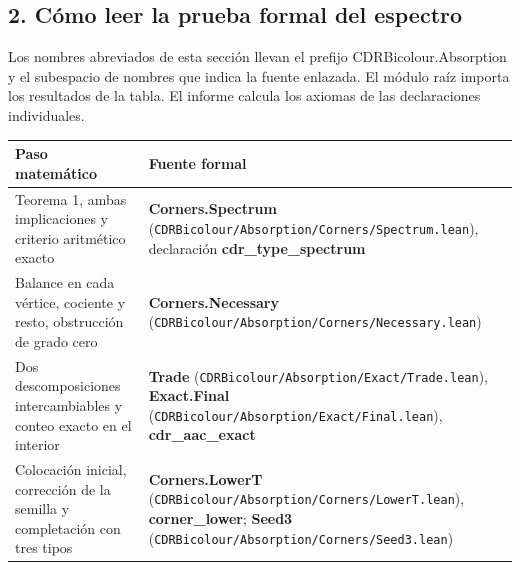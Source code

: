 \documentclass[spanish,11pt,a4paper]{article}
\begin{document}
\subsection{2. Cómo leer la prueba formal del espectro}\label{cuxf3mo-leer-la-prueba-formal-del-espectro}

Los nombres abreviados de esta sección llevan el prefijo CDRBicolour.Absorption y el subespacio de nombres que indica la fuente enlazada. El módulo raíz importa los resultados de la tabla. El informe calcula los axiomas de las declaraciones individuales.

{\begin{longtable}[]{@{}
  >{\raggedright\arraybackslash}p{}
  >{\raggedright\arraybackslash}p{}@{}}
\toprule\noalign{}
\begin{minipage}[b]{\linewidth}\raggedright
Paso matemático
\end{minipage} & \begin{minipage}[b]{\linewidth}\raggedright
Fuente formal
\end{minipage} \\
\midrule\noalign{}
\endhead
\bottomrule\noalign{}
\endlastfoot
Teorema 1, ambas implicaciones y criterio aritmético exacto & \textbf{Corners.Spectrum} (\texttt{CDRBicolour/\allowbreak{}Absorption/\allowbreak{}Corners/\allowbreak{}Spectrum.\allowbreak{}lean}), declaración \textbf{cdr\_\allowbreak{}type\_\allowbreak{}spectrum} \\
Balance en cada vértice, cociente y resto, obstrucción de grado cero & \textbf{Corners.Necessary} (\texttt{CDRBicolour/\allowbreak{}Absorption/\allowbreak{}Corners/\allowbreak{}Necessary.\allowbreak{}lean}) \\
Dos descomposiciones intercambiables y conteo exacto en el interior & \textbf{Trade} (\texttt{CDRBicolour/\allowbreak{}Absorption/\allowbreak{}Exact/\allowbreak{}Trade.\allowbreak{}lean}), \textbf{Exact.Final} (\texttt{CDRBicolour/\allowbreak{}Absorption/\allowbreak{}Exact/\allowbreak{}Final.\allowbreak{}lean}), \textbf{cdr\_\allowbreak{}aac\_\allowbreak{}exact} \\
Colocación inicial, corrección de la semilla y completación con tres tipos & \textbf{Corners.LowerT} (\texttt{CDRBicolour/\allowbreak{}Absorption/\allowbreak{}Corners/\allowbreak{}Lower\allowbreak{}T.\allowbreak{}lean}), \textbf{corner\_\allowbreak{}lower}; \textbf{Seed3} (\texttt{CDRBicolour/\allowbreak{}Absorption/\allowbreak{}Corners/\allowbreak{}Seed3.\allowbreak{}lean}) \\

\end{longtable}}
\end{document}
